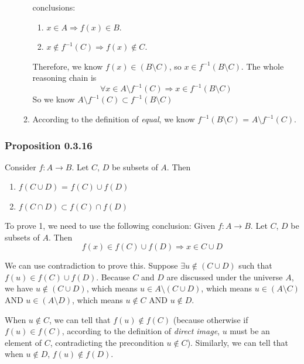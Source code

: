 \documentclass[12pt, letterpaper, oneside]{book}
\begin{document}
\begin{enumerate}
\begin{enumerate}
        conclusions:
        \begin{enumerate}
          \item $x \in A \Rightarrow f(x) \in B$.
          \item $x \notin f^{-1}(C) \Rightarrow f(x) \notin C$.
        \end{enumerate}
        Therefore, we know $f(x) \in (B \setminus C)$, so $x \in f^{-1}(B
          \setminus C)$. The whole
        reasoning chain is
        \[
          \forall x \in A \setminus f^{-1}(C) \Rightarrow x \in f^{-1}(B
          \setminus C)
        \]
        So we know $A \setminus f^{-1}(C) \subset f^{-1}(B \setminus C)$
      \item According to the definition of \textit{equal}, we know $f^{-1}(B
        \setminus C)$ = $A \setminus f^{-1}(C)$.
    \end{enumerate}
\end{enumerate}

\subsubsection{Proposition 0.3.16}

Consider $f: A \rightarrow B$. Let $C$, $D$ be subsets of $A$. Then
\begin{enumerate}
  \item $f(C \cup D)$ = $f(C) \cup f(D)$
  \item $f(C \cap D) \subset f(C) \cap f(D)$
\end{enumerate}

To prove 1, we need to use the following conclusion: Given $f: A \rightarrow B$.
Let $C$, $D$ be subsets of $A$. Then \[f(x) \in f(C) \cup f(D) \Rightarrow
x \in C \cup D\]

We can use contradiction to prove this. Suppose $\exists u \notin (C \cup D)$
such that $f(u) \in f(C) \cup f(D)$. Because $C$ and $D$ are discussed under
the universe $A$, we have $u \notin (C \cup D)$, which means $u \in A \setminus
(C \cup D)$, which means $u \in (A \setminus C)$ AND $u \in (A \setminus D)$,
which means $u \notin C$ AND $u \notin D$.

When $u \notin C$, we can tell that $f(u) \notin f(C)$ (because otherwise if
$f(u) \in f(C)$, according to the definition of \textit{direct image}, $u$ must
be an element of $C$, contradicting the precondition $u \notin C$). Similarly,
we can tell that when $u \notin D$, $f(u) \notin f(D)$.
\end{document}
